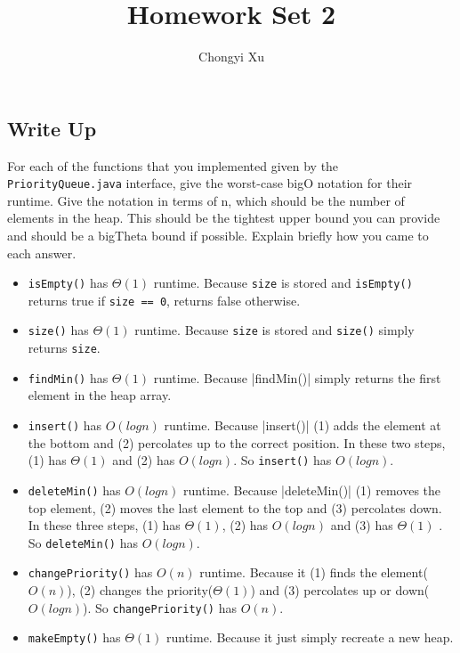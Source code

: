 \documentclass[]{exam}
\title{}
\title{Homework Set 2}
\author{Chongyi Xu}
\begin{document}
	
\maketitle
\begin{questions}
\section*{Write Up}
	\question For each of the functions that you implemented given by the \verb|PriorityQueue.java| interface, give the worst-case bigO notation for their runtime. Give the notation in terms of n, which should be the number of elements in the heap. This should be the tightest upper bound you can provide and should be a bigTheta bound if possible. Explain briefly how you came to each answer.
	\begin{itemize}
		\item \verb|isEmpty()| has $\Theta(1)$ runtime. Because \verb|size| is stored and \verb|isEmpty()| returns true if \verb|size == 0|, returns false otherwise.
		\item \verb|size()| has $\Theta(1)$ runtime. Because \verb|size| is stored and \verb|size()| simply returns \verb|size|.
		\item \verb|findMin()| has $\Theta(1)$ runtime. Because |findMin()| simply returns the first element in the heap array.
		\item \verb|insert()| has $O(log n)$ runtime. Because |insert()| (1) adds the element at the bottom and (2) percolates up to the correct position. In these two steps, (1) has $\Theta(1)$ and (2) has $O(log n)$. So \verb|insert()| has $O(log n)$.
		\item \verb|deleteMin()| has $O(log n)$ runtime. Because |deleteMin()| (1) removes the top element, (2) moves the last element to the top and (3) percolates down. In these three steps, (1) has $\Theta(1)$, (2) has $O(log n)$ and (3) has $\Theta(1)$ . So \verb|deleteMin()| has $O(log n)$.
		\item \verb|changePriority()| has $O(n)$ runtime. Because it (1) finds the element($O(n)$), (2) changes the priority($\Theta(1)$) and (3) percolates up or down($O(log n)$). So \verb|changePriority()| has $O(n)$.
		\item \verb|makeEmpty()| has $\Theta(1)$ runtime. Because it just simply recreate a new heap.
	\end{itemize}


\end{questions}
\end{document}
